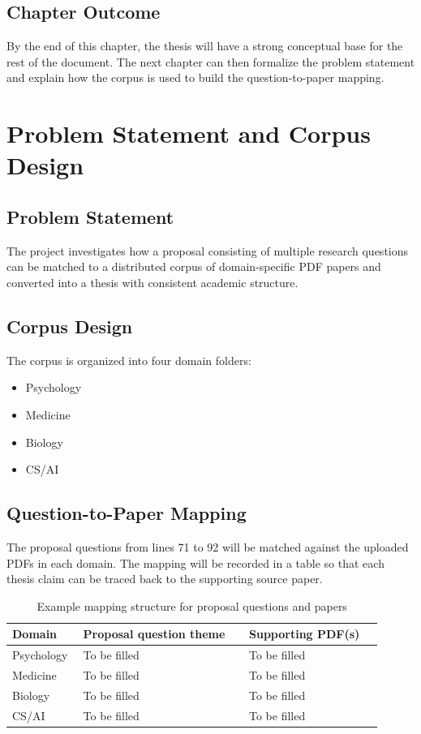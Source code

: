 \documentclass[12pt,a4paper,oneside]{book}
\begin{document}
\section{Chapter Outcome}
By the end of this chapter, the thesis will have a strong conceptual base for the rest of the document. The next chapter can then formalize the problem statement and explain how the corpus is used to build the question-to-paper mapping.

\chapter{Problem Statement and Corpus Design}

\section{Problem Statement}
The project investigates how a proposal consisting of multiple research questions can be matched to a distributed corpus of domain-specific PDF papers and converted into a thesis with consistent academic structure.

\section{Corpus Design}
The corpus is organized into four domain folders:
\begin{itemize}[leftmargin=*]
  \item Psychology
  \item Medicine
  \item Biology
  \item CS/AI
\end{itemize}

\section{Question-to-Paper Mapping}
The proposal questions from lines 71 to 92 will be matched against the uploaded PDFs in each domain. The mapping will be recorded in a table so that each thesis claim can be traced back to the supporting source paper.

\begin{table}[H]
\centering
\caption{Example mapping structure for proposal questions and papers}
\begin{tabularx}{\linewidth}{>{\raggedright\arraybackslash}p{0.18\linewidth} >{\raggedright\arraybackslash}p{0.42\linewidth} >{\raggedright\arraybackslash}p{0.34\linewidth}}
\toprule
Domain & Proposal question theme & Supporting PDF(s) \\
\midrule
Psychology & To be filled & To be filled \\
Medicine & To be filled & To be filled \\
Biology & To be filled & To be filled \\
CS/AI & To be filled & To be filled \\
\bottomrule
\end{tabularx}
\end{table}
\end{document}
